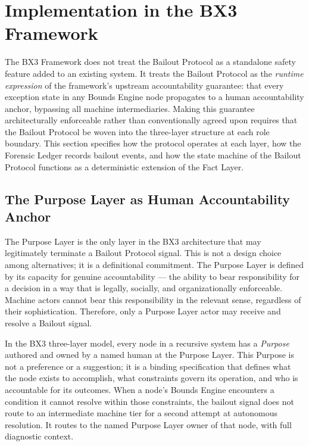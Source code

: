 \section{Implementation in the BX3 Framework}
\label{sec:implementation}

The BX3 Framework does not treat the Bailout Protocol as a standalone safety feature added to an existing system. It treats the Bailout Protocol as the \textit{runtime expression} of the framework's upstream accountability guarantee: that every exception state in any Bounds Engine node propagates to a human accountability anchor, bypassing all machine intermediaries. Making this guarantee architecturally enforceable rather than conventionally agreed upon requires that the Bailout Protocol be woven into the three-layer structure at each role boundary. This section specifies how the protocol operates at each layer, how the Forensic Ledger records bailout events, and how the state machine of the Bailout Protocol functions as a deterministic extension of the Fact Layer.

\subsection{The Purpose Layer as Human Accountability Anchor}
\label{sec:purpose-anchor}

The Purpose Layer is the only layer in the BX3 architecture that may legitimately terminate a Bailout Protocol signal. This is not a design choice among alternatives; it is a definitional commitment. The Purpose Layer is defined by its capacity for genuine accountability --- the ability to bear responsibility for a decision in a way that is legally, socially, and organizationally enforceable. Machine actors cannot bear this responsibility in the relevant sense, regardless of their sophistication. Therefore, only a Purpose Layer actor may receive and resolve a Bailout signal.

In the BX3 three-layer model, every node in a recursive system has a \textit{Purpose} authored and owned by a named human at the Purpose Layer. This Purpose is not a preference or a suggestion; it is a binding specification that defines what the node exists to accomplish, what constraints govern its operation, and who is accountable for its outcomes. When a node's Bounds Engine encounters a condition it cannot resolve within those constraints, the bailout signal does not route to an intermediate machine tier for a second attempt at autonomous resolution. It routes to the named Purpose Layer owner of that node, with full diagnostic context.

